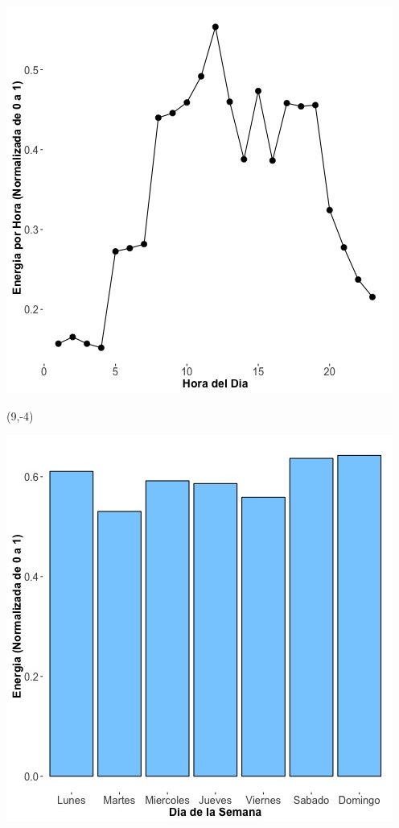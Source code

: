 \documentclass{article}\usepackage[]{graphicx}\usepackage[]{color}
\newenvironment{knitrout}{}{} %
\begin{document}
\begin{knitrout}
\color{fgcolor}
\includegraphics[scale=0.65]{figure/A6_plot_norm_median} 
\end{knitrout}

\begin{textblock}{1}(9,-4)
\begin{minipage}{20em}
\begingroup

\endgroup
\end{minipage}
\end{textblock}


\begin{knitrout}
\color{fgcolor}
\includegraphics[scale=0.65]{figure/A6_day_of_week_plot} 
\end{knitrout}
\end{document}
